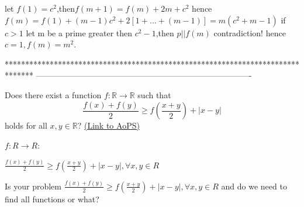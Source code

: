 \begin{solution}
	let $f(1)=c^2$,then$f(m+1)=f(m)+2m+c^2$
hence $f(m)=f(1)+(m-1)c^2+2[1+...+(m-1)]=m(c^2+m-1)$
if $c>1$ let m be a prime
greater then $c^2-1$,then $p||f(m)$ contradiction!
hence $c=1,f(m)=m^2$.
\end{solution}
*******************************************************************************
-------------------------------------------------------------------------------

\begin{problem}
	Does there exist a function $f: \mathbb R \to \mathbb R$ such that
\[{\frac{f(x)+f(y)}{2}}\ge f\left(\frac{x+y}{2}\right)+|x-y|\]
holds for all $x,y \in \mathbb R$?
	\flushright \href{https://artofproblemsolving.com/community/c6h389157}{(Link to AoPS)}
\end{problem}



\begin{solution}
	\begin{tcolorbox}$f: R\to R$:

${\frac{f(x)+f(y)}{2}}\ge f(\frac{x+y}{2})+|x-y|, \forall x,y \in R$\end{tcolorbox}


Is your problem ${\frac{f(x)+f(y)}{2}}\ge f(\frac{x+y}{2})+|x-y|, \forall x,y \in R$ and do we need to find all functions or what?
\end{solution}






